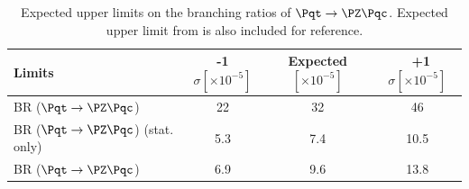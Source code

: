 \begin{table}[htbp]
	\centering
	\begin{tabular}{lccc} 
		\toprule
		\textbf{Limits} & \textbf{-1$\sigma [\times 10^{-5}]$} & \textbf{Expected  $[\times 10^{-5}]$} & \ \textbf{+1$\sigma [\times 10^{-5}]$}  \\
		\midrule
		BR ($\Pqt\rightarrow\PZ\Pqc$) \cite{TOPQ-2017-06} & 22 & 32& 46 \\
		BR ($\Pqt\rightarrow\PZ\Pqc$) (stat. only)                & 5.3 & 7.4 & 10.5 \\
		BR ($\Pqt\rightarrow\PZ\Pqc$)                                 & 6.9 & 9.6 & 13.8\\		
		\bottomrule
	\end{tabular}
	\caption{
		Expected upper limits on the branching ratios of $\Pqt\rightarrow\PZ\Pqc$.
		Expected upper limit from \cite{TOPQ-2017-06} is also included for reference.
	}%
	\label{tab:results:limits}
\end{table}

